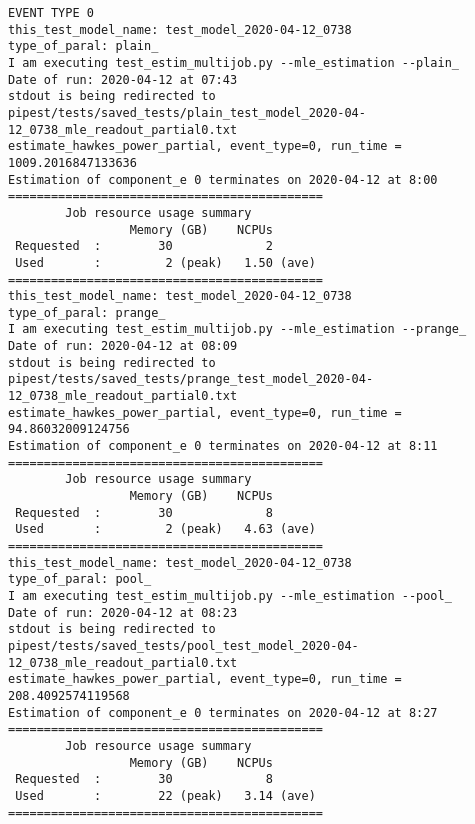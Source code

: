  \begin{Verbatim}[commandchars=\\\{\}, fontsize=\small]
EVENT TYPE 0
this_test_model_name: test_model_2020-04-12_0738
type_of_paral: plain_
I am executing test_estim_multijob.py --mle_estimation --plain_
Date of run: 2020-04-12 at 07:43
stdout is being redirected to pipest/tests/saved_tests/plain_test_model_2020-04-12_0738_mle_readout_partial0.txt
estimate_hawkes_power_partial, event_type=0, run_time = 1009.2016847133636
Estimation of component_e 0 terminates on 2020-04-12 at 8:00
============================================
        Job resource usage summary 
                 Memory (GB)    NCPUs
 Requested  :        30             2
 Used       :         2 (peak)   1.50 (ave)
============================================
this_test_model_name: test_model_2020-04-12_0738
type_of_paral: prange_
I am executing test_estim_multijob.py --mle_estimation --prange_
Date of run: 2020-04-12 at 08:09
stdout is being redirected to pipest/tests/saved_tests/prange_test_model_2020-04-12_0738_mle_readout_partial0.txt
estimate_hawkes_power_partial, event_type=0, run_time = 94.86032009124756
Estimation of component_e 0 terminates on 2020-04-12 at 8:11
============================================
        Job resource usage summary 
                 Memory (GB)    NCPUs
 Requested  :        30             8
 Used       :         2 (peak)   4.63 (ave)
============================================
this_test_model_name: test_model_2020-04-12_0738
type_of_paral: pool_
I am executing test_estim_multijob.py --mle_estimation --pool_
Date of run: 2020-04-12 at 08:23
stdout is being redirected to pipest/tests/saved_tests/pool_test_model_2020-04-12_0738_mle_readout_partial0.txt
estimate_hawkes_power_partial, event_type=0, run_time = 208.4092574119568
Estimation of component_e 0 terminates on 2020-04-12 at 8:27
============================================
        Job resource usage summary 
                 Memory (GB)    NCPUs
 Requested  :        30             8
 Used       :        22 (peak)   3.14 (ave)
============================================
 \end{Verbatim}
